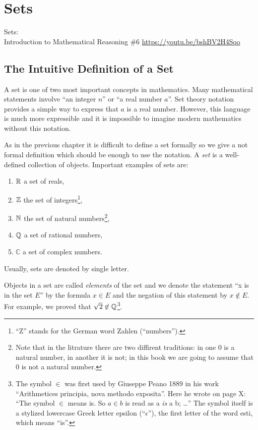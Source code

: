 \chapter{Sets}
\begin{marginfigure}
  {\scriptsize Sets:\\\noindent
  Introduction to Mathematical Reasoning \#6}
  \vskip 0.25cm
  \noindent
  \vskip 0.25cm
  \noindent
  \url{https://youtu.be/bshBV2H4Sqo}
\end{marginfigure}
\section{The Intuitive Definition of a Set}
A set is one of two most important concepts in mathematics. Many mathematical
statements involve ``an integer $n$'' or ``a real number $a$''. Set theory
notation provides a simple way to express that $a$ is a real number. However, this language is much more expressible and it is impossible to imagine modern mathematics without this notation.

As in the previous chapter it is difficult to define a set formally so we give a not formal definition which should be enough to use the notation.
A \textit{set} is a well-defined collection of objects. Important examples of
sets are:
\begin{enumerate}
  \item $\mathbb{R}$ a set of reals,
  \item $\mathbb{Z}$ the set of integers\footnote{``Z'' stands for the German word
    Zahlen (``numbers'').},
  \item $\mathbb{N}$ the set of natural numbers\footnote{Note that in the litrature
      there are two diffirent traditions: in one $0$ is a natural number, in
      another it is not; in this book we are going to assume that $0$ is not a
      natural number.
    },
  \item $\mathbb{Q}$ a set of rational numbers,
  \item $\mathbb{C}$ a set of complex numbers.
\end{enumerate}
Usually, sets are denoted by single letter.

Objects in a set are called \textit{elements} of the set and we denote the
statement ``x is in the set $E$'' by the formula $x \in E$ and the negation of
this statement by $x \not\in E$. For example, we proved that
$\sqrt{2} \not\in \mathbb{Q}$\footnote{%
  The symbol $\in$ was first used by Giuseppe Peano 1889 in his work ``Arithmetices principia, nova methodo exposita''. Here he wrote on page X:
  ``The symbol $\in$ means is. So $a \in b$ is read as a \textit{is} a b;
  \dots''
  The symbol itself is a stylized lowercase Greek letter epsilon
  (``$\epsilon$''), the first letter of the word  \textgreek{esti}, which means ``is''.
}.

